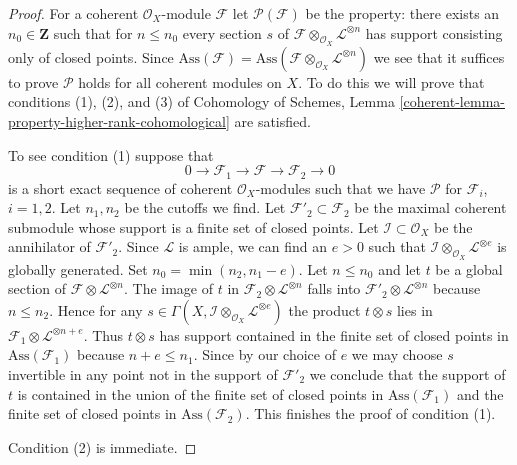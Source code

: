 \begin{proof}
For a coherent $\mathcal{O}_X$-module $\mathcal{F}$
let $\mathcal{P}(\mathcal{F})$ be the property: there
exists an $n_0 \in \mathbf{Z}$ such that for $n \leq n_0$
every section $s$ of
$\mathcal{F} \otimes_{\mathcal{O}_X} \mathcal{L}^{\otimes n}$
has support consisting only of closed points.
Since $\text{Ass}(\mathcal{F}) =
\text{Ass}(\mathcal{F} \otimes_{\mathcal{O}_X} \mathcal{L}^{\otimes n})$
we see that it suffices to prove $\mathcal{P}$
holds for all coherent modules on $X$.
To do this we will prove that conditions (1), (2), and (3) of
Cohomology of Schemes, Lemma
\ref{coherent-lemma-property-higher-rank-cohomological}
are satisfied.

\medskip\noindent
To see condition (1) suppose that
$$
0 \to \mathcal{F}_1 \to \mathcal{F} \to \mathcal{F}_2 \to 0
$$
is a short exact sequence of coherent $\mathcal{O}_X$-modules
such that we have $\mathcal{P}$ for $\mathcal{F}_i$, $i = 1, 2$.
Let $n_1, n_2$ be the cutoffs we find.
Let $\mathcal{F}'_2 \subset \mathcal{F}_2$ be the maximal
coherent submodule whose support is a finite set of closed
points. Let $\mathcal{I} \subset \mathcal{O}_X$ be the annihilator
of $\mathcal{F}'_2$. Since $\mathcal{L}$ is ample, we can find an $e > 0$
such that $\mathcal{I} \otimes_{\mathcal{O}_X} \mathcal{L}^{\otimes e}$
is globally generated. Set $n_0 = \min(n_2, n_1 - e)$. Let $n \leq n_0$
and let $t$ be a global section of
$\mathcal{F} \otimes \mathcal{L}^{\otimes n}$.
The image of $t$ in $\mathcal{F}_2 \otimes \mathcal{L}^{\otimes n}$
falls into $\mathcal{F}'_2 \otimes \mathcal{L}^{\otimes n}$ because
$n \leq n_2$. Hence for any
$s \in \Gamma(X, \mathcal{I} \otimes_{\mathcal{O}_X} \mathcal{L}^{\otimes e})$
the product $t \otimes s$ lies in
$\mathcal{F}_1 \otimes \mathcal{L}^{\otimes n + e}$.
Thus $t \otimes s$ has support contained in
the finite set of closed points in $\text{Ass}(\mathcal{F}_1)$
because $n + e \leq n_1$. Since by our choice of $e$
we may choose $s$ invertible in any point
not in the support of $\mathcal{F}'_2$
we conclude that the support of $t$ is contained in the union of the 
finite set of closed points in $\text{Ass}(\mathcal{F}_1)$ and
the finite set of closed points in $\text{Ass}(\mathcal{F}_2)$.
This finishes the proof of condition (1).

\medskip\noindent
Condition (2) is immediate.


\end{proof}
